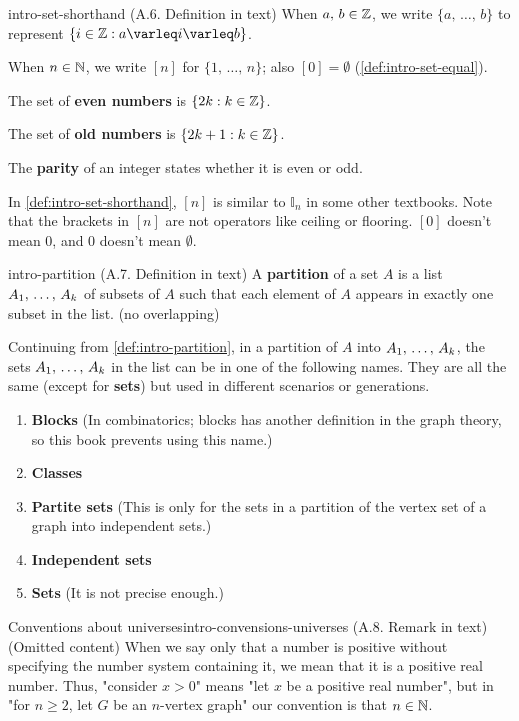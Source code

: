 \documentclass[../src/handouts/main.tex]{subfiles}
\begin{document}
\begin{definition}{}{intro-set-shorthand}
  (A.6. Definition in text)
  When $a,\, b \in \mathbb{Z}$, we write $\{a,\, \ldots,\, b\}$ to represent $\{ i \in \Z: a \leq i \leq b \}$.

  When $n \in \mathbb{N}$, we write $[n]$ for $\{1,\, \ldots,\, n\}$; also $[0] = \emptyset$ (\cref{def:intro-set-equal}).

  The set of \textbf{even numbers} is $\{ 2 k : k \in \mathbb{Z} \}$.

  The set of \textbf{old numbers} is $\{ 2 k + 1 : k \in \mathbb{Z} \}$.

  The \textbf{parity} of an integer states whether it is even or odd.
\end{definition}

In \cref{def:intro-set-shorthand}, $[n]$ is similar to $\mathbb{I}_n$ in some other textbooks. Note that the brackets in $[n]$ are not operators like ceiling or flooring. $[0]$ doesn't mean 0, and 0 doesn't mean $\emptyset$.

\begin{definition}{}{intro-partition}
  (A.7. Definition in text)
  A \textbf{partition} of a set $A$ is a list ${A}_1,\, \ldots,\, {A}_{k}$ of subsets of $A$ such that each element of $A$ appears in exactly one subset in the list. (no overlapping)
\end{definition}

Continuing from \cref{def:intro-partition}, in a partition of $A$ into ${A}_1,\, \ldots,\, {A}_{k}$, the sets ${A}_1,\, \ldots,\, {A}_{k}$ in the list can be in one of the following names. They are all the same (except for \textbf{sets}) but used in different scenarios or generations.
\begin{enumerate}
  \item \textbf{Blocks} (In combinatorics; blocks has another definition in the graph theory, so this book prevents using this name.)
  \item \textbf{Classes}
  \item \textbf{Partite sets} (This is only for the sets in a partition of the vertex set of a graph into independent sets.)
  \item \textbf{Independent sets}
  \item \textbf{Sets} (It is not precise enough.)
\end{enumerate}

\begin{remark}{Conventions about universes}{intro-convensions-universes}
  (A.8. Remark in text)
  (Omitted content)
  When we say only that a number is positive without specifying the number system containing it, we mean that it is a positive real number. Thus, "consider $x > 0$" means "let $x$ be a positive real number", but in "for $n \geq 2$, let $G$ be an $n$-vertex graph" our convention is that $n \in \mathbb{N}$.
\end{remark}
\end{document}
